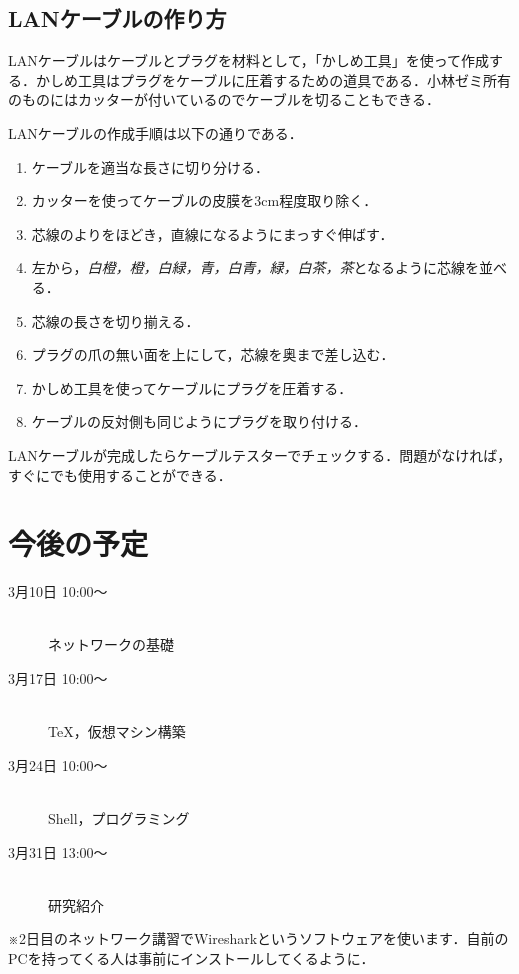 \documentclass[11pt]{jarticle}
\begin{document}
\subsection{LANケーブルの作り方}
LANケーブルはケーブルとプラグを材料として，「かしめ工具」を使って作成する．かしめ工具はプラグをケーブルに圧着するための道具である．小林ゼミ所有のものにはカッターが付いているのでケーブルを切ることもできる．

LANケーブルの作成手順は以下の通りである．

\begin{enumerate}
 \item ケーブルを適当な長さに切り分ける．
 \item カッターを使ってケーブルの皮膜を3cm程度取り除く．
 \item 芯線のよりをほどき，直線になるようにまっすぐ伸ばす．
 \item 左から，{\it 白橙，橙，白緑，青，白青，緑，白茶，茶}となるように芯線を並べる．
 \item 芯線の長さを切り揃える．
 \item プラグの爪の無い面を上にして，芯線を奥まで差し込む．
 \item かしめ工具を使ってケーブルにプラグを圧着する．
 \item ケーブルの反対側も同じようにプラグを取り付ける．
\end{enumerate}

LANケーブルが完成したらケーブルテスターでチェックする．問題がなければ，すぐにでも使用することができる．

\newpage

\section{今後の予定}

\begin{description}
 \item[3月10日 10:00〜]\mbox{}\\ 
 	ネットワークの基礎
 \item[3月17日 10:00〜]\mbox{}\\
	TeX，仮想マシン構築
 \item[3月24日 10:00〜]\mbox{}\\
	Shell，プログラミング
 \item[3月31日 13:00〜]\mbox{}\\
 	研究紹介
\end{description}

※2日目のネットワーク講習でWiresharkというソフトウェアを使います．自前のPCを持ってくる人は事前にインストールしてくるように．
\end{document}
